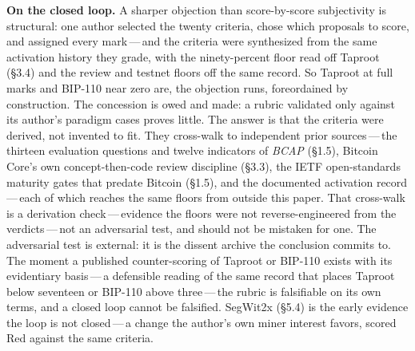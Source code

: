 \documentclass[11pt, twoside, openright]{book}
\newcommand{\sect}[1]{\S#1}
\begin{document}
\medskip
\noindent\textbf{On the closed loop.} A sharper objection than score-by-score subjectivity is structural: one author selected the twenty criteria, chose which proposals to score, and assigned every mark\,---\,and the criteria were synthesized from the same activation history they grade, with the ninety-percent floor read off Taproot (\sect{3.4}) and the review and testnet floors off the same record. So Taproot at full marks and BIP-110 near zero are, the objection runs, foreordained by construction. The concession is owed and made: a rubric validated only against its author's paradigm cases proves little. The answer is that the criteria were derived, not invented to fit. They cross-walk to independent prior sources\,---\,the thirteen evaluation questions and twelve indicators of \textit{BCAP} (\sect{1.5}), Bitcoin Core's own concept-then-code review discipline (\sect{3.3}), the IETF open-standards maturity gates that predate Bitcoin (\sect{1.5}), and the documented activation record\,---\,each of which reaches the same floors from outside this paper. That cross-walk is a derivation check\,---\,evidence the floors were not reverse-engineered from the verdicts\,---\,not an adversarial test, and should not be mistaken for one. The adversarial test is external: it is the dissent archive the conclusion commits to. The moment a published counter-scoring of Taproot or BIP-110 exists with its evidentiary basis\,---\,a defensible reading of the same record that places Taproot below seventeen or BIP-110 above three\,---\,the rubric is falsifiable on its own terms, and a closed loop cannot be falsified. SegWit2x (\sect{5.4}) is the early evidence the loop is not closed\,---\,a change the author's own miner interest favors, scored Red against the same criteria.
\end{document}
